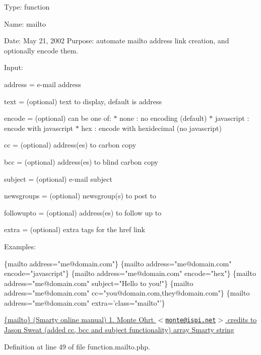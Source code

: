 \-Type\-: function\par
 \-Name\-: mailto\par
 \-Date\-: \-May 21, 2002 \-Purpose\-: automate mailto address link creation, and optionally encode them.\par
 \-Input\-:\par

\begin{DoxyItemize}
\item address = e-\/mail address
\item text = (optional) text to display, default is address
\item encode = (optional) can be one of\-: $\ast$ none \-: no encoding (default) $\ast$ javascript \-: encode with javascript $\ast$ hex \-: encode with hexidecimal (no javascript)
\item cc = (optional) address(es) to carbon copy
\item bcc = (optional) address(es) to blind carbon copy
\item subject = (optional) e-\/mail subject
\item newsgroups = (optional) newsgroup(s) to post to
\item followupto = (optional) address(es) to follow up to
\item extra = (optional) extra tags for the href link
\end{DoxyItemize}

\-Examples\-: 
\begin{DoxyPre}
 \{mailto address="me@domain.com"\}
 \{mailto address="me@domain.com" encode="javascript"\}
 \{mailto address="me@domain.com" encode="hex"\}
 \{mailto address="me@domain.com" subject="Hello to you!"\}
 \{mailto address="me@domain.com" cc="you@domain.com,they@domain.com"\}
 \{mailto address="me@domain.com" extra='class="mailto"'\}
 \end{DoxyPre}
 \hyperlink{}{\{mailto\} (\-Smarty online manual)  1.  \-Monte \-Ohrt $<$\href{mailto:monte@ispi.net}{\tt monte@ispi.\-net}$>$  credits to \-Jason \-Sweat (added cc, bcc and subject functionality)  array  \-Smarty  string }

\-Definition at line 49 of file function.\-mailto.\-php.


